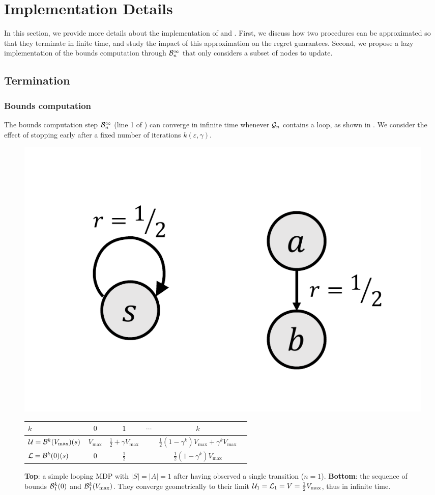 \documentclass[runningheads]{llncs}
\begin{document}
\section{Implementation Details}
\label{sec:implementation}

In this section, we provide more details about the implementation of \GBOPD and \GBOP. First, we discuss how two procedures can be approximated so that they terminate in finite time, and study the impact of this approximation on the regret guarantees. Second, we propose a lazy implementation of the bounds computation through $\mathcal{B}_n^\infty$ that only considers a subset of nodes to update.

\subsection{Termination}

\subsubsection{Bounds computation}

The bounds computation step $\mathcal{B}_n^\infty$ (line 1 of \GBOPD) can converge in infinite time whenever $\mathcal{G}_n$ contains a loop, as shown in . We consider the effect of stopping early after a fixed number of iterations $k(\varepsilon,\gamma)$.

\begin{figure}[th]
	\centering
	\includegraphics[trim=2.5cm 1cm 9cm 2cm, clip, width=0.1\linewidth]{img/loop.pdf}\\
	\begin{tabular}{lccccc}
		\toprule
		$k$ & $0$ & $1$ & $\cdots$ & $k$ \\
		\midrule
		$\mathcal{U} = \mathcal{B}^k(V_{\max})(s)$ & $V_{\max}$ & $\frac{1}{2} + \gamma V_{\max}$ && $\frac{1}{2}(1-\gamma^k)V_{\max} + \gamma^k V_{\max}$\\
		$\mathcal{L} = \mathcal{B}^k(0)(s)$ & $0$ & $\frac{1}{2}$ && $\frac{1}{2}(1-\gamma^k)V_{\max}$\\
		\bottomrule
	\end{tabular}
	\caption{\textbf{Top}: a simple looping MDP with $|S|=|A|=1$ after having observed a single transition ($n=1$). \textbf{Bottom}: the sequence of bounds $\mathcal{B}_1^k(0)$ and $\mathcal{B}_1^k(V_{\max})$. They converge geometrically to their limit $\mathcal{U}_1 = \mathcal{L}_1 = V = \frac{1}{2}V_{\max}$, thus in infinite time.}
	\label{fig:simple_loop}
\end{figure}
\end{document}
